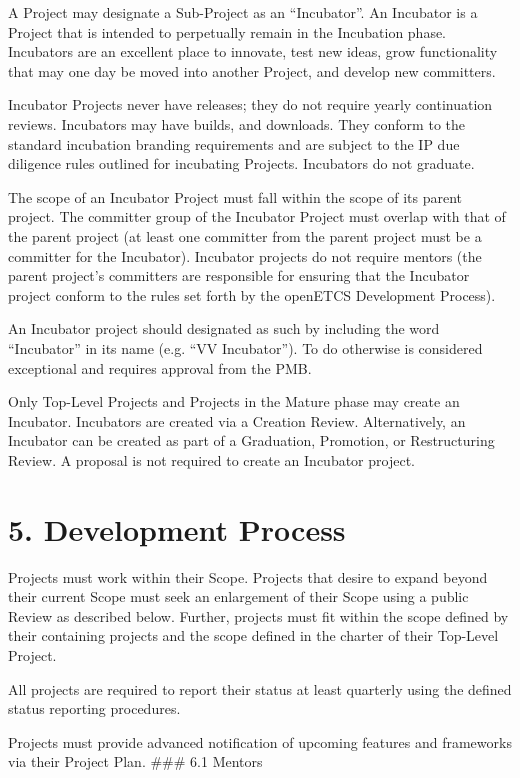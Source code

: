 A Project may designate a Sub-Project as an ``Incubator''. An Incubator
is a Project that is intended to perpetually remain in the Incubation
phase. Incubators are an excellent place to innovate, test new ideas,
grow functionality that may one day be moved into another Project, and
develop new committers.

Incubator Projects never have releases; they do not require yearly
continuation reviews. Incubators may have builds, and downloads. They
conform to the standard incubation branding requirements and are subject
to the IP due diligence rules outlined for incubating Projects.
Incubators do not graduate.

The scope of an Incubator Project must fall within the scope of its
parent project. The committer group of the Incubator Project must
overlap with that of the parent project (at least one committer from the
parent project must be a committer for the Incubator). Incubator
projects do not require mentors (the parent project's committers are
responsible for ensuring that the Incubator project conform to the rules
set forth by the openETCS Development Process).

An Incubator project should designated as such by including the word
``Incubator'' in its name (e.g. ``VV Incubator''). To do otherwise is
considered exceptional and requires approval from the PMB.

Only Top-Level Projects and Projects in the Mature phase may create an
Incubator. Incubators are created via a Creation Review. Alternatively,
an Incubator can be created as part of a Graduation, Promotion, or
Restructuring Review. A proposal is not required to create an Incubator
project.

\section{5. Development Process}\label{development-process}

Projects must work within their Scope. Projects that desire to expand
beyond their current Scope must seek an enlargement of their Scope using
a public Review as described below. Further, projects must fit within
the scope defined by their containing projects and the scope defined in
the charter of their Top-Level Project.

All projects are required to report their status at least quarterly
using the defined status reporting procedures.

Projects must provide advanced notification of upcoming features and
frameworks via their Project Plan. \#\#\# 6.1 Mentors

